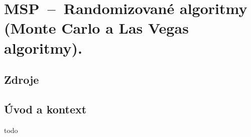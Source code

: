 

\graphicspath{{msp/randomizovane_algoritmy/figures}}


\chapter{MSP~--~Randomizované algoritmy (Monte Carlo a Las Vegas algoritmy).}


\section{Zdroje}

\begin{compactitem}
    \item {}
    \item {}
\end{compactitem}


\section{Úvod a kontext}

todo
